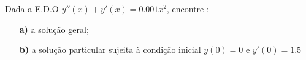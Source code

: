 \linespread{1.5}
Dada a E.D.O $y''(x) + y'(x) = 0.001x^2$, encontre :
\begin{itemize}
    \item[\textbf{a)}] a solução geral;
    \item[\textbf{b)}] a solução particular sujeita à condição inicial $y(0) = 0$ e $y'(0) = 1.5$
\end{itemize}